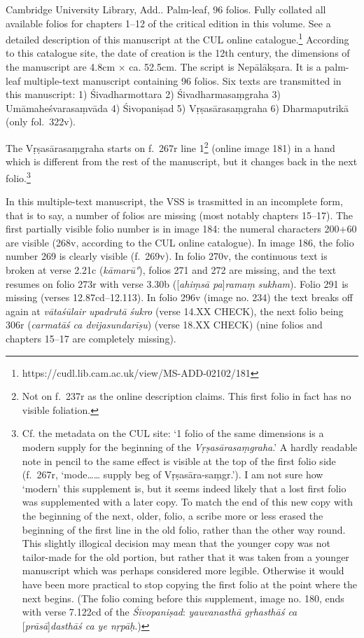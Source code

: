 \documentclass[11pt]{book}
\begin{document}
Cambridge University Library, Add.. 
Palm-leaf, 96 folios. Fully
collated all available folios for chapters 1--12 of the critical edition
in this volume. See a detailed description of this manuscript at the CUL
online catalogue.\footnote{https://cudl.lib.cam.ac.uk/view/MS-ADD-02102/181}
According to this catalogue site, the date of creation is the 12th
century, the dimensions of the manuscript are 4.8cm × ca. 52.5cm. The
script is Nepālākṣara. It is a palm-leaf multiple-text manuscript
containing 96 folios. Six texts are transmitted in this manuscript: 1)
Śivadharmottara 2) Śivadharmasaṃgraha 3) Umāmaheśvarasaṃvāda 4)
Śivopaniṣad 5) Vṛṣasārasaṃgraha 6) Dharmaputrikā (only fol.~322v).

The Vṛṣasārasaṃgraha starts on f.~267r line 1\footnote{Not on f.~237r as
  the online description claims. This first folio in fact has no visible
  foliation.} (online image 181) in a hand which is different from the
rest of the manuscript, but it changes back in the next folio.\footnote{Cf.
  the metadata on the CUL site: `1 folio of the same dimensions is a
  modern supply for the beginning of the \emph{Vṛṣasārasaṃgraha}.' A
  hardly readable note in pencil to the same effect is visible at the
  top of the first folio side (f.~267r, `mode\ldots{}\ldots{} supply beg
  of Vṛṣasāra-saṃgr.'). I am not sure how `modern' this supplement is,
  but it seems indeed likely that a lost first folio was supplemented
  with a later copy. To match the end of this new copy with the
  beginning of the next, older, folio, a scribe more or less erased the
  beginning of the first line in the old folio, rather than the other
  way round. This slightly illogical decision may mean that the younger
  copy was not tailor-made for the old portion, but rather that it was
  taken from a younger manuscript which was perhaps considered more
  legible. Otherwise it would have been more practical to stop copying
  the first folio at the point where the next begins. (The folio coming
  before this supplement, image no. 180, ends with verse 7.122cd of the
  \emph{Śivopaniṣad}: \emph{yauvanasthā gṛhasthāś ca}
  {[}\emph{prāsā}{]}\emph{dasthāś ca ye nṛpāḥ}.)}

In this multiple-text manuscript, the VSS is trasmitted in an incomplete
form, that is to say, a number of folios are missing (most notably
chapters 15--17). The first partially visible folio number is in image
184: the numeral characters 200+60 are visible (268v, according to the
CUL online catalogue). In image 186, the folio number 269 is clearly
visible (f.~269v). In folio 270v, the continuous text is broken at verse
2.21c (\emph{kāmarū°}), folios 271 and 272 are missing, and the text
resumes on folio 273r with verse 3.30b ({[}\emph{ahiṃsā
pa}{]}\emph{ramaṃ} \emph{sukham}). Folio 291 is missing (verses
12.87cd--12.113). In folio 296v (image no. 234) the text breaks off
again at \emph{vātaśūlair upadrutā} \textbar{} \emph{śukro} (verse 14.XX
CHECK), the next folio being 306r (\emph{carmatāś ca dvijasundarīṣu})
(verse 18.XX CHECK) (nine folios and chapters 15--17 are completely
missing).
\end{document}
